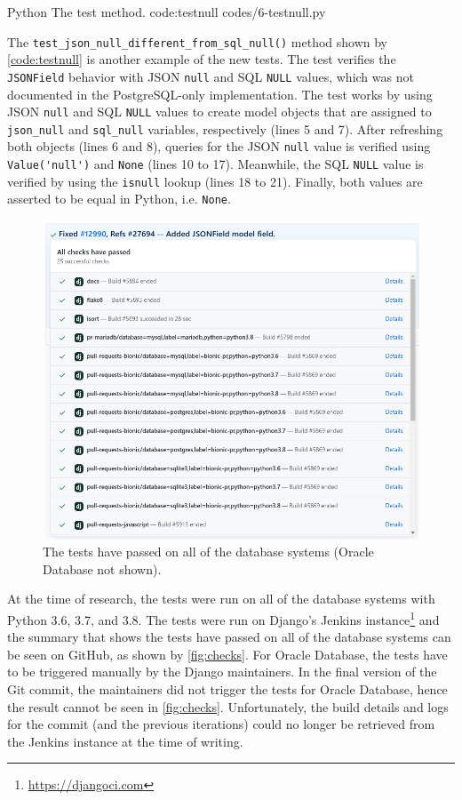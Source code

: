 \listing
{Python}
{The  test method.}
{code:testnull}
{codes/6-testnull.py}

The \verb|test_json_null_different_from_sql_null()| method shown by
\autoref{code:testnull} is another example of the new tests. The test verifies
the \verb|JSONField| behavior with JSON \verb|null| and SQL \verb|NULL| values,
which was not documented in the PostgreSQL-only implementation. The test works
by using JSON \verb|null| and SQL \verb|NULL| values to create model objects
that are assigned to \verb|json_null| and \verb|sql_null| variables,
respectively (lines 5 and 7). After refreshing both objects (lines 6 and 8),
queries for the JSON \verb|null| value is verified using \verb|Value('null')|
and \verb|None| (lines 10 to 17). Meanwhile, the SQL \verb|NULL| value is
verified by using the \verb|isnull| lookup (lines 18 to 21). Finally, both
values are asserted to be equal in Python, i.e. \verb|None|.

\begin{figure}
	\centering
    \includegraphics[width=1.00\textwidth]{pics/github-checks.png}
	\caption{The tests have passed on all of the database systems
	(Oracle Database not shown).}
	\label{fig:checks}
\end{figure}

At the time of research, the tests were run on all of the database systems with
Python 3.6, 3.7, and 3.8. The tests were run on Django's Jenkins
instance\footnote{\url{https://djangoci.com}} and the summary that shows the
tests have passed on all of the database systems can be seen on GitHub, as
shown by \autoref{fig:checks}. For Oracle Database, the tests have to be
triggered manually by the Django maintainers. In the final version of the Git
commit, the maintainers did not trigger the tests for Oracle Database, hence
the result cannot be seen in \autoref{fig:checks}. Unfortunately, the build
details and logs for the commit (and the previous iterations) could no longer
be retrieved from the Jenkins instance at the time of writing.
